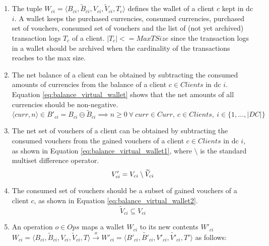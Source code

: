 \begin{enumerate}
	\item The tuple $W_{ci} = \langle B_{ci}, \widetilde{B}_{ci}, V_{ci}, \widetilde{V}_{ci}, T_{c} \rangle$ defines the wallet of a client $c$ kept in \gls{dc} $i$. A wallet keeps the purchased currencies, consumed currencies, purchased set of vouchers, consumed set of vouchers and the list of (not yet archived) transaction logs $T_{c}$ of a client. $|T_{c}| <= MaxTSize$ since the transaction logs in a wallet should be archived when the cardinality of the transactions reaches to the max size.

	\item The net balance of a client can be obtained by subtracting the consumed amounts of currencies from the balance of a client $c \in Clients$ in \gls{dc} $i$. Equation \ref{eq:balance_virtual_wallet} shows that the net amounts of all currencies should be non-negative.
	\begin{equation}  \label{eq:balance_virtual_wallet}
		\langle curr, n \rangle \in B'_{ci} = B_{ci} \ominus \widetilde{B}_{ci} \implies 
		n \ge 0 ~ \forall ~  curr \in Curr, ~  c \in Clients,  ~  i \in \{1,\dots, |DC|\} 
	\end{equation}

	\item The net set of vouchers of a client can be obtained by subtracting the consumed vouchers from the gained vouchers of a client $c \in Clients$ in \gls{dc} $i$, as shown in Equation \ref{eq:balance_virtual_wallet1}, where $\setminus$ is the standard multiset difference operator.
	\begin{equation} \label{eq:balance_virtual_wallet1}
		V'_{ci} = V_{ci} \setminus \widetilde{V}_{ci} \\
	\end{equation}
  
	\item The consumed set of vouchers should be a subset of gained vouchers of a client $c$, as shown in Equation \ref{eq:balance_virtual_wallet2}.
	\begin{equation}  \label{eq:balance_virtual_wallet2}
		\widetilde{V}_{ci} \subseteq V_{ci}   
	\end{equation}
		
	\item An operation $o \in Ops$ maps a wallet $W_{ci}$ to its new contents $W'_{ci}$  $W_{ci} = \langle B_{ci}, \widetilde{B}_{ci}, V_{ci}, \widetilde{V}_{ci}, T \rangle \overset{o}{\rightarrow} W'_{ci} = \langle B'_{ci}, \widetilde{B'}_{ci}, V'_{ci}, \widetilde{V'}_{ci}, T' \rangle$ as follows: 
	

\end{enumerate}
